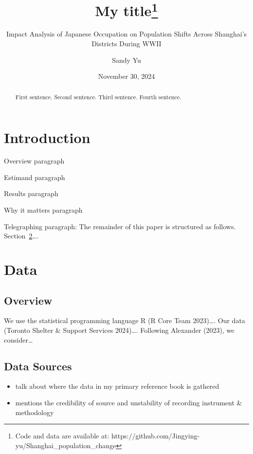 \documentclass[
  letterpaper,
  DIV=11,
  numbers=noendperiod]{scrartcl}
\title{My title\thanks{Code and data are available at:
https://github.com/Jingying-yu/Shanghai\_population\_change}}
\subtitle{Impact Analysis of Japanese Occupation on Population Shifts
Across Shanghai's Districts During WWII}
\author{Sandy Yu}
\date{November 30, 2024}
\providecommand{\tightlist}{%
  \setlength{\itemsep}{0pt}\setlength{\parskip}{0pt}}\usepackage{longtable,booktabs,array}
\begin{document}
\maketitle
\begin{abstract}
First sentence. Second sentence. Third sentence. Fourth sentence.
\end{abstract}
\ifdefined\Shaded\renewenvironment{Shaded}{\begin{tcolorbox}[enhanced, breakable, frame hidden, boxrule=0pt, interior hidden, borderline west={3pt}{0pt}{shadecolor}, sharp corners]}{\end{tcolorbox}}\fi

\hypertarget{introduction}{%
\section{Introduction}\label{introduction}}

Overview paragraph

Estimand paragraph

Results paragraph

Why it matters paragraph

Telegraphing paragraph: The remainder of this paper is structured as
follows. Section~\ref{sec-data}\ldots.

\hypertarget{sec-data}{%
\section{Data}\label{sec-data}}

\hypertarget{overview}{%
\subsection{Overview}\label{overview}}

We use the statistical programming language R (R Core Team 2023)\ldots.
Our data (Toronto Shelter \& Support Services 2024)\ldots. Following
Alexander (2023), we consider\ldots{}

\hypertarget{data-sources}{%
\subsection{Data Sources}\label{data-sources}}

\begin{itemize}
\tightlist
\item
  talk about where the data in my primary reference book is gathered
\item
  mentions the credibility of source and unstability of recording
  instrument \& methodology
\end{itemize}
\end{document}
